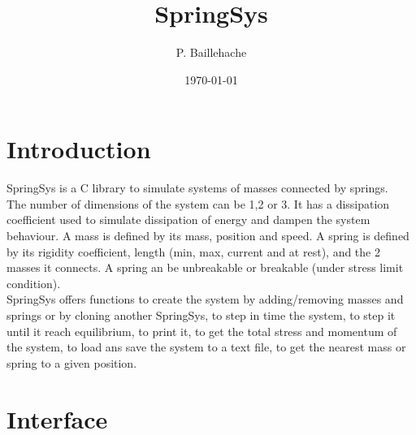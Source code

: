 \documentclass[12pt, a4paper]{article}
\begin{document}
\title{SpringSys}
\author{P. Baillehache}
\date{\today}
\maketitle

\tableofcontents

\section*{Introduction}

SpringSys is a C library to simulate systems of masses connected by springs.\\

The number of dimensions of the system can be 1,2 or 3. It has a dissipation coefficient used to simulate dissipation of energy and dampen the system behaviour. A mass is defined by its mass, position and speed. A spring is defined by its rigidity coefficient, length (min, max, current and at rest), and the 2 masses it connects. A spring an be unbreakable or breakable (under stress limit condition).\\

SpringSys offers functions to create the system by adding/removing masses and springs or by cloning another SpringSys, to step in time the system, to step it until it reach equilibrium, to print it, to get the total stress and momentum of the system, to load ans save the system to a text file, to get the nearest mass or spring to a given position.\\ 

\section{Interface}
\end{document}
